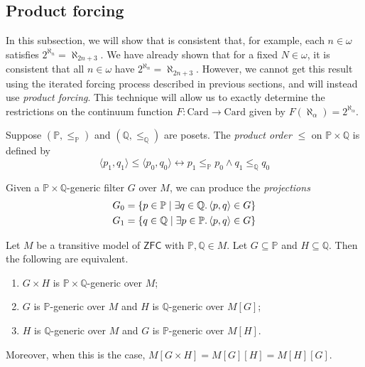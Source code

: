 \subsection{Product forcing}
In this subsection, we will show that is consistent that, for example, each \( n \in \omega \) satisfies \( 2^{\aleph_n} = \aleph_{2n + 3} \).
We have already shown that for a fixed \( N \in \omega \), it is consistent that all \( n \in \omega \) have \( 2^{\aleph_n} = \aleph_{2n + 3} \).
However, we cannot get this result using the iterated forcing process described in previous sections, and will instead use \emph{product forcing}.
This technique will allow us to exactly determine the restrictions on the continuum function \( F : \mathrm{Card} \to \mathrm{Card} \) given by \( F(\aleph_\alpha) = 2^{\aleph_\alpha} \).
\begin{definition}
    Suppose \( (\mathbb P, \leq_{\mathbb P}) \) and \( (\mathbb Q, \leq_{\mathbb Q}) \) are posets.
    The \emph{product order} \( \leq \) on \( \mathbb P \times \mathbb Q \) is defined by
    \[ \langle p_1, q_1 \rangle \leq \langle p_0, q_0 \rangle \leftrightarrow p_1 \leq_{\mathbb P} p_0 \wedge q_1 \leq_{\mathbb Q} q_0 \]
\end{definition}
Given a \( \mathbb P \times \mathbb Q \)-generic filter \( G \) over \( M \), we can produce the \emph{projections}
\begin{align*}
    G_0 &= \qty{p \in \mathbb P \mid \exists q \in \mathbb Q.\, \langle p, q \rangle \in G} \\
    G_1 &= \qty{q \in \mathbb Q \mid \exists p \in \mathbb P.\, \langle p, q \rangle \in G}
\end{align*}
\begin{lemma}
    Let \( M \) be a transitive model of \( \mathsf{ZFC} \) with \( \mathbb P, \mathbb Q \in M \).
    Let \( G \subseteq \mathbb P \) and \( H \subseteq \mathbb Q \).
    Then the following are equivalent.
    \begin{enumerate}
        \item \( G \times H \) is \( \mathbb P \times \mathbb Q \)-generic over \( M \);
        \item \( G \) is \( \mathbb P \)-generic over \( M \) and \( H \) is \( \mathbb Q \)-generic over \( M[G] \);
        \item \( H \) is \( \mathbb Q \)-generic over \( M \) and \( G \) is \( \mathbb P \)-generic over \( M[H] \).
    \end{enumerate}
    Moreover, when this is the case, \( M[G \times H] = M[G][H] = M[H][G] \).
\end{lemma}
